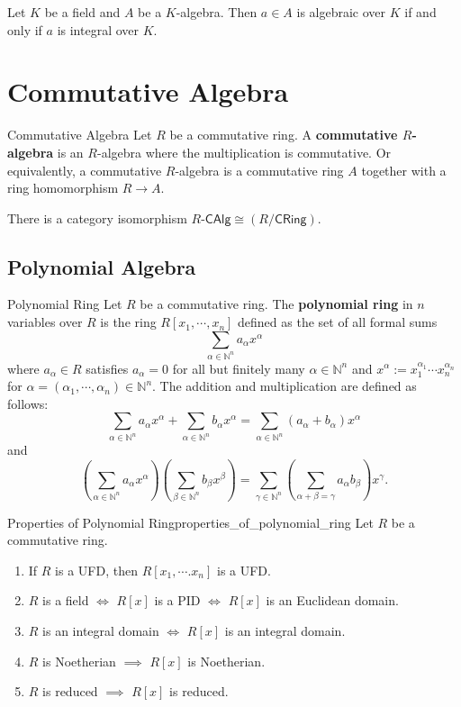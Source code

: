 Let $K$ be a field and $A$ be a $K$-algebra. Then $a\in A$ is algebraic over $K$ if and only if $a$ is integral over $K$.


\section{Commutative Algebra}
\begin{definition}{Commutative Algebra}{}
    Let $R$ be a commutative ring. A \textbf{commutative $R$-algebra} is an $R$-algebra where the multiplication is commutative. Or equivalently, a commutative $R$-algebra is a commutative ring $A$ together with a ring homomorphism $R\to A$. 
\end{definition}

\begin{remark}
    There is a category isomorphism $R\text{-}\mathsf{CAlg}\cong \left(R/\mathsf{CRing}\right)$.
\end{remark}

\subsection{Polynomial Algebra}
\begin{definition}{Polynomial Ring}{}
    Let $R$ be a commutative ring. The \textbf{polynomial ring} in $n$ variables over $R$ is the ring $R[x_1,\cdots,x_n]$ defined as the set of all formal sums $$\sum_{\alpha\in\mathbb{N}^n}a_\alpha x^\alpha$$ where $a_\alpha\in R$ satisfies $a_\alpha=0$ for all but finitely many $\alpha\in\mathbb{N}^n$ and $x^\alpha:=x_1^{\alpha_1}\cdots x_n^{\alpha_n}$ for $\alpha=(\alpha_1,\cdots,\alpha_n)\in\mathbb{N}^n$. The addition and multiplication are defined as follows: $$\sum_{\alpha\in\mathbb{N}^n}a_\alpha x^\alpha+\sum_{\alpha\in\mathbb{N}^n}b_\alpha x^\alpha=\sum_{\alpha\in\mathbb{N}^n}(a_\alpha+b_\alpha)x^\alpha$$ and $$\left(\sum_{\alpha\in\mathbb{N}^n}a_\alpha x^\alpha\right)\left(\sum_{\beta\in\mathbb{N}^n}b_\beta x^\beta\right)=\sum_{\gamma\in\mathbb{N}^n}\left(\sum_{\alpha+\beta=\gamma}a_\alpha b_\beta\right)x^\gamma.$$
\end{definition}


\begin{proposition}{Properties of Polynomial Ring}{properties_of_polynomial_ring}
    Let $R$ be a commutative ring.
    \begin{enumerate}
        \item If $R$ is a UFD, then $R[x_1,\cdots.x_n]$ is a UFD.
        \item $R$ is a field $\iff$ $R[x]$ is a PID $\iff$ $R[x]$ is an Euclidean domain.
        \item $R$ is an integral domain $\iff$ $R[x]$ is an integral domain.
        \item $R$ is Noetherian $\implies$ $R[x]$ is Noetherian.
        \item $R$ is reduced $\implies$ $R[x]$ is reduced.
    \end{enumerate}
\end{proposition}




